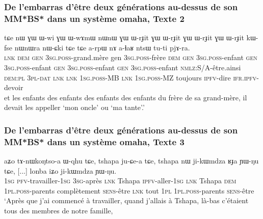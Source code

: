 \documentclass[xcolor=table]{beamer}
\newcommand{\ipa}[1]{{\phon #1}} %
\begin{document}
  \begin{frame} 
 \frametitle{De l'embarras d'être deux générations au-dessus de son MM*BS* dans un système omaha, Texte 2} 
\begin{exe}
\ex 
\gll 
\ipa{tɕe} 	\ipa{nɯ} 	\ipa{ɣɯ} 	\ipa{ɯ-wi} 	\ipa{ɣɯ} 	\ipa{ɯ-wɤmɯ} 	\ipa{nɯnɯ} 	\ipa{ɣɯ} 	\ipa{ɯ-rɟit} 	\ipa{ɣɯ} 	\ipa{ɯ-rɟit} 	\ipa{ɣɯ} 	\ipa{ɯ-rɟit} 	\ipa{ɣɯ} 	\ipa{ɯ-rɟit} 	\ipa{kɯ-fse} 	\ipa{nɯnɯra} 	\ipa{nɯ-ɕki} 	\ipa{tɕe} 	\ipa{tɕe} 	\ipa{a-rpɯ} \ipa{nɤ} \ipa{a-ɬaʁ} 	\ipa{ntsɯ} 	\ipa{tu-ti} 	\ipa{pjɤ-ra.} \\
\textsc{lnk} \textsc{dem} \textsc{gen} \textsc{3sg.poss}-grand.mère gen \textsc{3sg.poss}-frère \textsc{dem} \textsc{gen} \textsc{3sg.poss}-enfant \textsc{gen} \textsc{3sg.poss}-enfant \textsc{gen} \textsc{3sg.poss}-enfant \textsc{gen} \textsc{3sg.poss}-enfant \textsc{nmlz}:S/A-être.ainsi \textsc{dem:pl} \textsc{3pl-dat} \textsc{lnk}  \textsc{lnk} \textsc{1sg.poss}-MB \textsc{lnk} \textsc{1sg.poss}-MZ toujours \textsc{ipfv}-dire \textsc{ifr.ipfv}-devoir \\
\glt et les enfants des enfants des enfants des enfants du frère de sa grand-mère, il devait les appeller `mon oncle' ou `ma tante'.'
\end{exe}
\end{frame}

  \begin{frame} 
 \frametitle{De l'embarras d'être deux générations au-dessus de son MM*BS* dans un système omaha, Texte 3} 
 \begin{exe}
\ex 
\gll 
\ipa{aʑo} 	\ipa{tɤ-nɯkoŋtso-a} 	\ipa{ɯ-qhu} 	\ipa{tɕe,} 	\ipa{tshapa} 	\ipa{ju-ɕe-a} 	\ipa{tɕe,} 	\ipa{tshapa} 	\ipa{nɯ} 	\ipa{ji-kɯmdza} 	\ipa{ʁɟa} 	\ipa{ɲɯ-ŋu} 	\ipa{tɕe,} 	[...] \ipa{lonba} 	\ipa{iʑo} 	\ipa{ji-kɯmdza} 	\ipa{ɲɯ-ŋu.}  \\
\textsc{1sg} \textsc{pfv}-travailler-\textsc{1sg} \textsc{3sg}-après \textsc{lnk} Tshapa \textsc{ipfv}-aller-\textsc{1sg} \textsc{lnk} Tshapa \textsc{dem} \textsc{1pl.poss}-parents  complètement \textsc{sens}-être \textsc{lnk} { } tout \textsc{1pl} \textsc{1pl.poss}-parents  \textsc{sens}-être \\
\glt `Après que j'ai commencé à travailler, quand j'allais à Tshapa, là-bas c'étaient tous des membres de notre famille,
\end{exe}
\end{frame}
\end{document}
